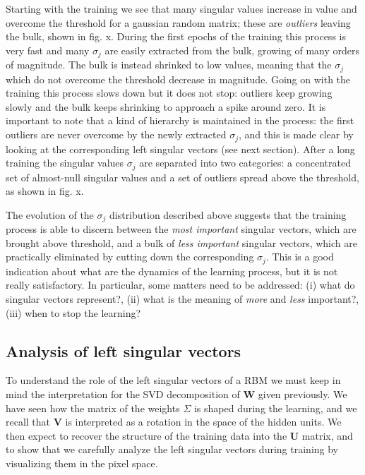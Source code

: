 \documentclass[twocolumn]{article}
\begin{document}
Starting with the training we see that many singular values increase in value and overcome the threshold for a gaussian random matrix; these are \textit{outliers} leaving the bulk, shown in fig. x. During the first epochs of the training this process is very fast and many \(\sigma_j\) are easily extracted from the bulk, growing of many orders of magnitude. The bulk is instead shrinked to low values, meaning that the \(\sigma_j\) which do not overcome the threshold decrease in magnitude. Going on with the training this process slows down but it does not stop: outliers keep growing slowly and the bulk keeps shrinking to approach a spike around zero. It is important to note that a kind of hierarchy is maintained in the process: the first outliers are never overcome by the newly extracted \(\sigma_j\), and this is made clear by looking at the corresponding left singular vectors (see next section).
After a long training the singular values \(\sigma_j\) are separated into two categories: a concentrated set of almost-null singular values and a set of outliers spread above the threshold, as shown in fig. x.

The evolution of the \(\sigma_j\) distribution described above suggests that the training process is able to discern between the \textit{most important} singular vectors, which are brought above threshold, and a bulk of \textit{less important} singular vectors, which are practically eliminated by cutting down the corresponding \(\sigma_j\). This is a good indication about what are the dynamics of the learning process, but it is not really satisfactory. In particular, some matters need to be addressed: (i) what do singular vectors represent?, (ii) what is the meaning of \textit{more} and \textit{less} important?, (iii) when to stop the learning?

\subsection{Analysis of left singular vectors}

To understand the role of the left singular vectors of a RBM we must keep in mind the interpretation for the SVD decomposition of \textbf{W} given previously. We have seen how the matrix of the weights \textbf{\(\Sigma\)} is shaped during the learning, and we recall that \textbf{V} is interpreted as a rotation in the space of the hidden units. We then expect to recover the structure of the training data into the \textbf{U} matrix, and to show that we carefully analyze the left singular vectors during training by visualizing them in the pixel space.
\end{document}
